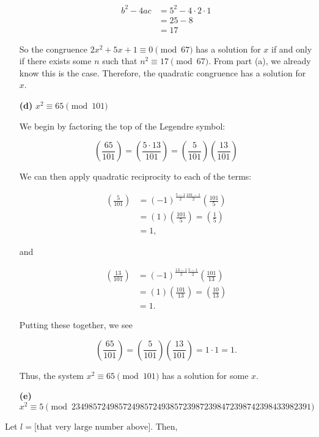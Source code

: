 \documentclass[12pt]{amsart}
\newcommand{\lsym}[2]{\ensuremath{\left(\frac{#1}{#2} \right)}}
\begin{document}
\begin{itemize}
\[
\begin{split}
b^2 - 4ac &= 5^2 - 4\cdot 2\cdot 1 \\
&= 25 - 8 \\
&= 17
\end{split}
\]

So the congruence $2x^2 + 5x + 1 \equiv 0\pmod{67}$ has a solution for $x$ if and only if there exists some $n$ such that $n^2 \equiv 17\pmod{67}$. From part (a), we already know this is the case. Therefore, the quadratic congruence has a solution for $x$.

\medskip

\item[{\bf (d)}]  $x^2\equiv65\pmod{101}$ 

\medskip

We begin by factoring the top of the Legendre symbol:

\[\left(\frac{65}{101} \right)=\left(\frac{5\cdot 13}{101} \right)= \left(\frac{5}{101} \right) \left(\frac{13}{101} \right)\]

We can then apply quadratic reciprocity to each of the terms:

\[
\begin{split}
\left(\frac{5}{101}\right)&=(-1)^{\frac{5-1}{2}\frac{101-1}{2}}\left(\frac{101}{5} \right) \\
&= (1)\left(\frac{101}{5} \right) = \left(\frac{1}{5} \right) \\
&= 1,
\end{split}
\]

and

\[
\begin{split}
\lsym{13}{101} &= (-1)^{\frac{13-1}{2}\frac{5-1}{2}}\lsym{101}{13} \\
&=(1)\lsym{101}{13}=\lsym{10}{13} \\
&= 1.
\end{split}
\]

Putting these together, we see 

\[ 
\lsym{65}{101}=\lsym{5}{101}\lsym{13}{101}=1\cdot 1 = 1.
\] 

Thus, the system $x^2 \equiv 65\pmod{101}$ has a solution for some $x$.

\medskip

\item[{\bf (e)}]  $x^2\equiv5\pmod{23498572498572498572493857239872398472398742398433982391}$ 
\end{itemize}

Let $l=\text{[that very large number above]}$. Then,
\end{document}
